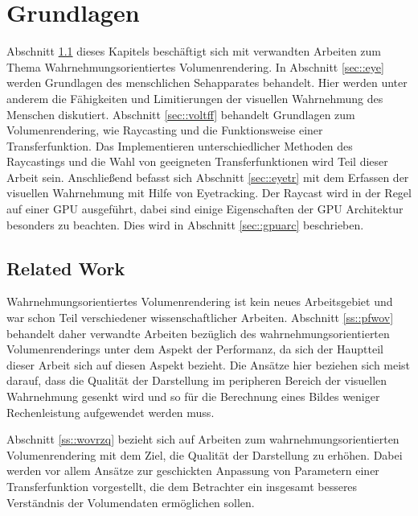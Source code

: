 
\chapter{Grundlagen}\label{chap::basics}
\label{chap:k2}
Abschnitt \ref{sec::relwo} dieses Kapitels beschäftigt sich mit verwandten Arbeiten zum Thema Wahrnehmungsorientiertes Volumenrendering.
In Abschnitt \ref{sec::eye} werden Grundlagen des menschlichen Sehapparates behandelt.
Hier werden unter anderem die Fähigkeiten und Limitierungen der visuellen Wahrnehmung des Menschen diskutiert.
Abschnitt \ref{sec::voltff} behandelt Grundlagen zum Volumenrendering, wie Raycasting und die Funktionsweise einer Transferfunktion.
Das Implementieren unterschiedlicher Methoden des Raycastings und die Wahl von geeigneten Transferfunktionen wird Teil dieser Arbeit sein.
Anschließend befasst sich Abschnitt \ref{sec::eyetr} mit dem Erfassen der visuellen Wahrnehmung mit Hilfe von Eyetracking.
Der Raycast wird in der Regel auf einer GPU ausgeführt, dabei sind einige Eigenschaften der GPU Architektur besonders zu beachten.
Dies wird in Abschnitt \ref{sec::gpuarc} beschrieben.

\section{Related Work}\label{sec::relwo}
Wahrnehmungsorientiertes Volumenrendering ist kein neues Arbeitsgebiet und war schon Teil verschiedener wissenschaftlicher Arbeiten.
Abschnitt \ref{ss::pfwov} behandelt daher verwandte Arbeiten bezüglich des wahrnehmungsorientierten Volumenrenderings unter dem Aspekt der Performanz, da sich der Hauptteil dieser Arbeit sich auf diesen Aspekt bezieht.
Die Ansätze hier beziehen sich meist darauf, dass die Qualität der Darstellung im peripheren Bereich der visuellen Wahrnehmung gesenkt wird und so für die Berechnung eines Bildes weniger Rechenleistung aufgewendet werden muss.

Abschnitt \ref{ss::wovrzq} bezieht sich auf Arbeiten zum wahrnehmungsorientierten Volumenrendering mit dem Ziel, die Qualität der Darstellung zu erhöhen.
Dabei werden vor allem Ansätze zur geschickten Anpassung von Parametern einer Transferfunktion vorgestellt, die dem Betrachter ein insgesamt besseres Verständnis der Volumendaten ermöglichen sollen.
